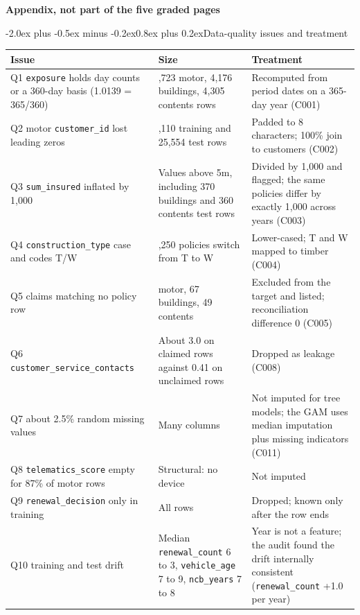 \documentclass[11pt,a4paper]{article}
\makeatletter
\renewcommand\section{\@startsection{section}{1}{\z@}%
  {-2.0ex plus -0.5ex minus -0.2ex}{0.8ex plus 0.2ex}{\normalfont\large\bfseries}}
\newenvironment{fixedtable}%
  {\par\medskip\noindent\begin{minipage}{\linewidth}\def\@captype{table}\centering}%
  {\end{minipage}\par\medskip}
\newcommand{\code}[1]{\texttt{#1}}
\makeatother
\begin{document}
\clearpage
\appendix
\begin{center}
{\Large\bfseries Appendix, not part of the five graded pages}
\end{center}

\section{Data-quality issues and treatment}
\label{app:first}
\label{app:dq}

\begin{fixedtable}
\centering\small
\begin{tabularx}{\textwidth}{>{\raggedright\arraybackslash}p{4.9cm}>{\raggedright\arraybackslash}p{4.2cm}>{\raggedright\arraybackslash}X}
\toprule
Issue & Size & Treatment\\
\midrule
Q1 \code{exposure} holds day counts or a 360-day basis (1.0139 = 365/360) & 5,723 motor, 4,176 buildings, 4,305 contents rows & Recomputed from period dates on a 365-day year (C001)\\
Q2 motor \code{customer\_id} lost leading zeros & 98,110 training and 25,554 test rows & Padded to 8 characters; 100\% join to customers (C002)\\
Q3 \code{sum\_insured} inflated by 1,000 & Values above 5m, including 370 buildings and 360 contents test rows & Divided by 1,000 and flagged; the same policies differ by exactly 1,000 across years (C003)\\
Q4 \code{construction\_type} case and codes T/W & 13,250 policies switch from T to W & Lower-cased; T and W mapped to timber (C004)\\
Q5 claims matching no policy row & 294 motor, 67 buildings, 49 contents & Excluded from the target and listed; reconciliation difference 0 (C005)\\
Q6 \code{customer\_service\_contacts} & About 3.0 on claimed rows against 0.41 on unclaimed rows & Dropped as leakage (C008)\\
Q7 about 2.5\% random missing values & Many columns & Not imputed for tree models; the GAM uses median imputation plus missing indicators (C011)\\
Q8 \code{telematics\_score} empty for 87\% of motor rows & Structural: no device & Not imputed\\
Q9 \code{renewal\_decision} only in training & All rows & Dropped; known only after the row ends\\
Q10 training and test drift & Median \code{renewal\_count} 6 to 3, \code{vehicle\_age} 7 to 9, \code{ncb\_years} 7 to 8 & Year is not a feature; the audit found the drift internally consistent (\code{renewal\_count} +1.0 per year)\\
\bottomrule
\end{tabularx}
\caption{Data-quality issues in the developed market and their treatment (\code{docs/DATA\_GUIDE.md}, \code{docs/CHANGELOG.md}).}
\end{fixedtable}
\end{document}

